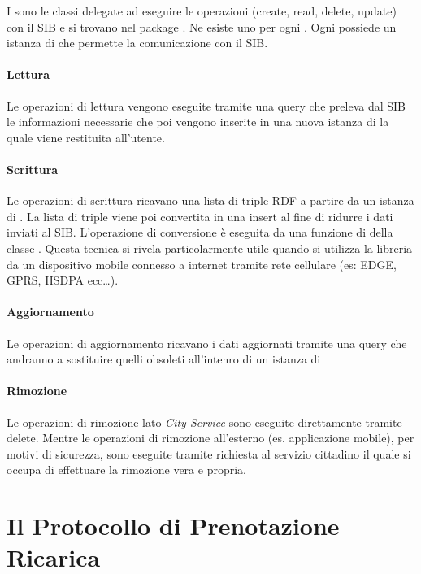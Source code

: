 I  sono le classi delegate ad eseguire le operazioni  (create, read, delete, update) con il SIB e si trovano nel package . Ne esiste uno per ogni . Ogni  possiede un istanza di  che permette la comunicazione con il SIB. 

\paragraph{Lettura} Le operazioni di lettura vengono eseguite tramite una query  che preleva dal SIB le informazioni necessarie che poi vengono inserite in una nuova istanza di  la quale viene restituita all'utente.

\paragraph{Scrittura} Le operazioni di scrittura ricavano una lista di triple RDF a partire da un istanza di . La lista di triple viene poi convertita in una  insert al fine di ridurre i dati inviati al SIB. L'operazione di conversione è eseguita da una funzione di della  classe . Questa tecnica si rivela particolarmente utile quando si utilizza la libreria da un dispositivo mobile connesso a internet tramite rete cellulare (es: EDGE, GPRS, HSDPA ecc\dots).

\paragraph{Aggiornamento} Le operazioni di aggiornamento ricavano i dati aggiornati tramite una query  che andranno a sostituire quelli obsoleti all'intenro di un istanza di 

\paragraph{Rimozione} Le operazioni di rimozione lato \emph{City Service} sono eseguite direttamente tramite  delete. Mentre le operazioni di rimozione all'esterno (es. applicazione mobile), per motivi di sicurezza, sono eseguite tramite richiesta al servizio cittadino il quale si occupa di effettuare la rimozione vera e propria.

\section{Il Protocollo di Prenotazione Ricarica}


